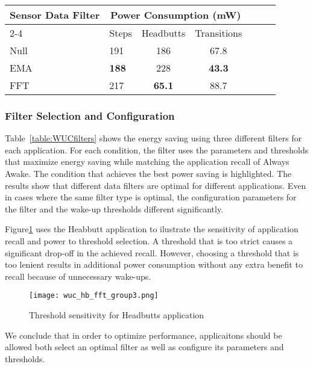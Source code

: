 \begin{table*}[t]
\centering
{\small
    \begin{tabular}{|l|l|c|c|c|c|c|}
	\hline
    \multirow{2}{*}{Sensor Data Filter}    	& \multicolumn{3}{c|}{Power Consumption (mW)} \\ \cline{2-4}
							& Steps	& Headbutts	& Transitions 	\\ \hline
    Null     				& 191		& 186		& 67.8 			\\ \hline
	EMA   				& {\bf 188}		& 228		& {\bf 43.3} 			\\ \hline
	FFT 				& 217		& {\bf 65.1} 		& 88.7 			\\ \hline
	
    \end{tabular}
}
	\caption{Average power for Group 2 runs with different filters.}
	\label{table:WUCfilters}
\end{table*}

\subsubsection{Filter Selection and Configuration}

Table~\ref{table:WUCfilters} shows the energy saving using three
different filters for each application.  For each condition, the
filter uses the parameters and thresholds that maximize energy saving
while matching the application recall of Always Awake.  The condition
that achieves the best power saving is highlighted.  The results show
that different data filters are optimal for different applications.
Even in cases where the same filter type is optimal, the configuration
parameters for the filter and the wake-up thresholds different
significantly.  

Figure\ref{fig:wucHeadbuttFFTRecallPowerGroup3} uses the Heabbutt
application to ilustrate the sensitivity of application recall and
power to threshold selection.  A threshold that is too strict causes a
significant drop-off in the achieved recall.  However, choosing a
threshold that is too lenient results in additional power consumption
without any extra benefit to recall because of unnecessary wake-ups.

\begin{figure}[h]
	\texttt{[image: wuc\_hb\_fft\_group3.png]}
	\caption{Threshold sensitivity for Headbutts application}
    \label{fig:wucHeadbuttFFTRecallPowerGroup3}
\end{figure}

We conclude that in order to optimize performance, applicaitons should
be allowed both select an optimal filter as well as configure its
parameters and thresholds.

